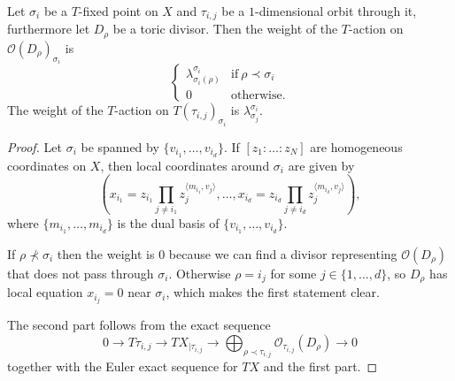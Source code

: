 \begin{lem}\label{lem:weights}
 Let $\sigma_i$ be a $T$-fixed point on $X$ and $\tau_{i,j}$ be a $1$-dimensional orbit through it, furthermore let $D_\rho$ be a toric divisor. Then the weight of the $T$-action on $\mathcal O(D_\rho)_{\sigma_i}$ is
 \[
  \begin{cases}
      \lambda^{\sigma_i}_{\sigma_i(\rho)} & \text{if}\ \rho\prec \sigma_i \\
      0 & \text{otherwise.}
    \end{cases}
 \]
The weight of the $T$-action on $T(\tau_{i,j})_{\sigma_i}$ is $\lambda^{\sigma_i}_{\sigma_j}$.
\end{lem}
\begin{proof}
 Let $\sigma_i$ be spanned by $\{v_{i_1},\ldots,v_{i_d}\}$. If $[z_1:\ldots:z_N]$ are homogeneous coordinates on $X$, then local coordinates around $\sigma_i$ are given by \[\left(x_{i_1}=z_{i_1}\prod_{j\neq i_1}z_j^{\langle m_{i_1},v_j\rangle},\ldots,x_{i_d}=z_{i_d}\prod_{j\neq i_d}z_j^{\langle m_{i_d},v_j\rangle}\right),\] where $\{m_{i_1},\ldots,m_{i_d}\}$ is the dual basis of $\{v_{i_1},\ldots,v_{i_d}\}$.
 
 If $\rho\nprec \sigma_i$ then the weight is $0$ because we can find a divisor representing $\mathcal O(D_\rho)$ that does not pass through $\sigma_i$. Otherwise $\rho=i_j$ for some $j\in\{1,\ldots,d\}$, so $D_{\rho}$ has local equation $x_{i_j}=0$ near $\sigma_i$, which makes the first statement clear.
 
 The second part follows from the exact sequence
 \[
  0\to T\tau_{i,j}\to TX_{|\tau_{i,j}}\to \bigoplus_{\rho\prec\tau_{i,j}}\mathcal O_{\tau_{i,j}}(D_{\rho})\to 0
 \]
together with the Euler exact sequence for $TX$ and the first part.
\end{proof}

